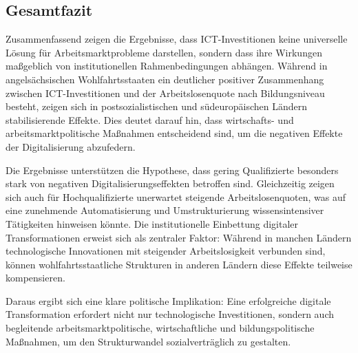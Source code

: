 
\subsection{Gesamtfazit}

Zusammenfassend zeigen die Ergebnisse, dass \ac{ICT}-Investitionen keine universelle Lösung für 
Arbeitsmarktprobleme darstellen, sondern dass ihre Wirkungen maßgeblich von institutionellen 
Rahmenbedingungen abhängen. Während in angelsächsischen Wohlfahrtsstaaten ein deutlicher 
positiver Zusammenhang zwischen \ac{ICT}-Investitionen und der Arbeitslosenquote nach 
Bildungsniveau besteht, zeigen sich in postsozialistischen und südeuropäischen Ländern 
stabilisierende Effekte. Dies deutet darauf hin, dass wirtschafts- und arbeitsmarktpolitische 
Maßnahmen entscheidend sind, um die negativen Effekte der Digitalisierung abzufedern.

Die Ergebnisse unterstützen die Hypothese, dass gering Qualifizierte besonders stark von negativen 
Digitalisierungseffekten betroffen sind. Gleichzeitig zeigen sich auch für Hochqualifizierte 
unerwartet steigende Arbeitslosenquoten, was auf eine zunehmende Automatisierung und 
Umstrukturierung wissensintensiver Tätigkeiten hinweisen könnte. Die institutionelle Einbettung 
digitaler Transformationen erweist sich als zentraler Faktor: Während in manchen Ländern 
technologische Innovationen mit steigender Arbeitslosigkeit verbunden sind, können 
wohlfahrtsstaatliche Strukturen in anderen Ländern diese Effekte teilweise kompensieren.

Daraus ergibt sich eine klare politische Implikation: Eine erfolgreiche digitale Transformation 
erfordert nicht nur technologische Investitionen, sondern auch begleitende arbeitsmarktpolitische, 
wirtschaftliche und bildungspolitische Maßnahmen, um den Strukturwandel sozialverträglich zu 
gestalten.
